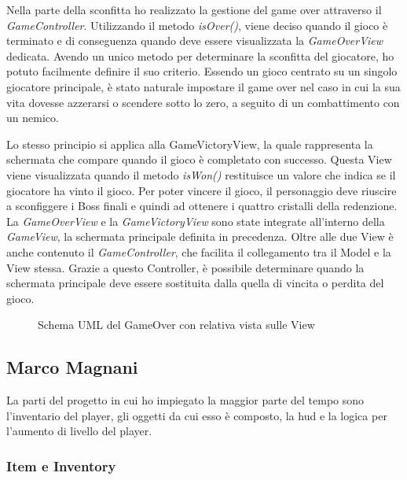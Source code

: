 \documentclass[a4paper,12pt]{report}
\begin{document}
Nella parte della sconfitta ho realizzato la gestione del game over attraverso il \textit{GameController}. Utilizzando il metodo \textit{isOver()}, viene deciso quando il gioco è terminato e di conseguenza quando deve essere visualizzata la \textit{GameOverView} dedicata. Avendo un unico metodo per determinare la sconfitta del giocatore, ho potuto facilmente definire il suo criterio. Essendo un gioco centrato su un singolo giocatore principale, è stato naturale impostare il game over nel caso in cui la sua vita dovesse azzerarsi o scendere sotto lo zero, a seguito di un combattimento con un nemico. 

Lo stesso principio si applica alla GameVictoryView, la quale rappresenta la schermata che compare quando il gioco è completato con successo. Questa View viene visualizzata quando il metodo \textit{isWon()} restituisce un valore che indica se il giocatore ha vinto il gioco. Per poter vincere il gioco, il personaggio deve riuscire a sconfiggere i Boss finali e quindi ad ottenere i quattro cristalli della redenzione.\\

La \textit{GameOverView} e la \textit{GameVictoryView} sono state integrate all'interno della \textit{GameView}, la schermata principale definita in precedenza. Oltre alle due View è anche contenuto il \textit{GameController}, che facilita il collegamento tra il Model e la View stessa. Grazie a questo Controller, è possibile determinare quando la schermata principale deve essere sostituita dalla quella di vincita o perdita del gioco.

\begin{figure}[H]
	\centering
	
	\caption{Schema UML del GameOver con relativa vista sulle View}
	\label{fig:the-exiled-victory_gameover-uml}
\end{figure}

\subsection*{Marco Magnani}
La parti del progetto in cui ho impiegato la maggior parte del tempo sono l'inventario del player, gli oggetti da cui esso è composto, la hud e la logica per l'aumento di livello del player.

\subsubsection{Item e Inventory}
\end{document}
